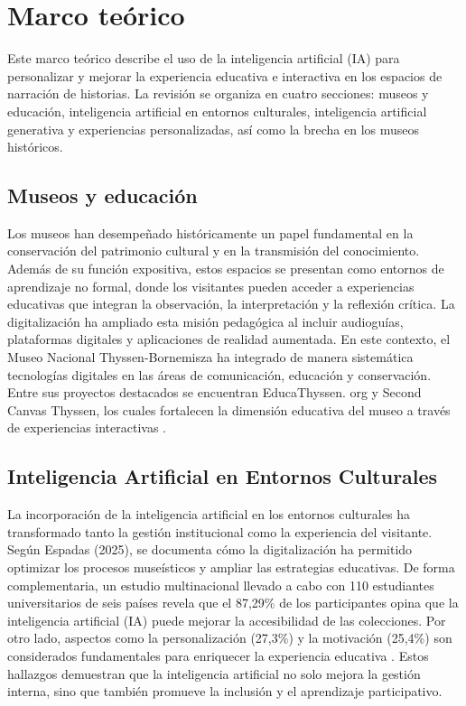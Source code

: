 \documentclass[pdflatex,sn-mathphys-num]{sn-jnl}%
\theoremstyle{thmstyleone}%
\theoremstyle{thmstyletwo}%
\theoremstyle{thmstylethree}%
\begin{document}
\section{Marco teórico}
Este marco teórico describe el uso de la inteligencia artificial (IA) para personalizar y mejorar la experiencia educativa e interactiva en los espacios de narración de historias. La revisión se organiza en cuatro secciones: museos y educación, inteligencia artificial en entornos culturales, inteligencia artificial generativa y experiencias personalizadas, así como la brecha en los museos históricos.

\subsection{Museos y educación}   
Los museos han desempeñado históricamente un papel fundamental en la conservación del patrimonio cultural y en la transmisión del conocimiento. Además de su función expositiva, estos espacios se presentan como entornos de aprendizaje no formal, donde los visitantes pueden acceder a experiencias educativas que integran la observación, la interpretación y la reflexión crítica. La digitalización ha ampliado esta misión pedagógica al incluir audioguías, plataformas digitales y aplicaciones de realidad aumentada.
En este contexto, el Museo Nacional Thyssen-Bornemisza ha integrado de manera sistemática tecnologías digitales en las áreas de comunicación, educación y conservación. Entre sus proyectos destacados se encuentran EducaThyssen. org y Second Canvas Thyssen, los cuales fortalecen la dimensión educativa del museo a través de experiencias interactivas \cite{espadas2025}.

\subsection{Inteligencia Artificial en Entornos Culturales}
La incorporación de la inteligencia artificial en los entornos culturales ha transformado tanto la gestión institucional como la experiencia del visitante. Según Espadas (2025), se documenta cómo la digitalización ha permitido optimizar los procesos museísticos y ampliar las estrategias educativas. De forma complementaria, un estudio multinacional llevado a cabo con 110 estudiantes universitarios de seis países revela que el 87,29\% de los participantes opina que la inteligencia artificial (IA) puede mejorar la accesibilidad de las colecciones. Por otro lado, aspectos como la personalización (27,3\%) y la motivación (25,4\%) son considerados fundamentales para enriquecer la experiencia educativa \cite{suicmez2025}. Estos hallazgos demuestran que la inteligencia artificial no solo mejora la gestión interna, sino que también promueve la inclusión y el aprendizaje participativo.
\end{document}
